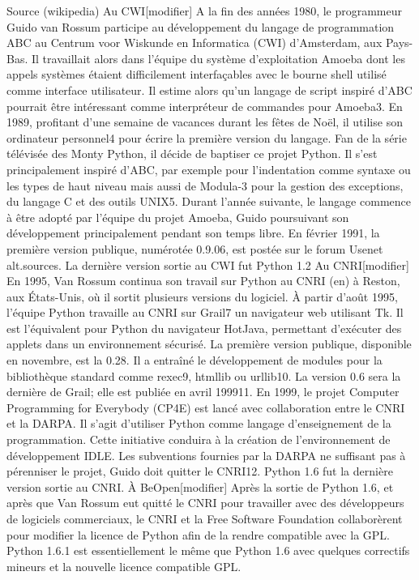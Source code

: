 Source (wikipedia)
Au CWI[modifier]
A la fin des années 1980, le programmeur Guido van Rossum participe au développement du langage de programmation ABC au Centrum voor Wiskunde en Informatica (CWI) d'Amsterdam, aux Pays-Bas. Il travaillait alors dans l’équipe du système d’exploitation Amoeba dont les appels systèmes étaient difficilement interfaçables avec le bourne shell utilisé comme interface utilisateur. Il estime alors qu’un langage de script inspiré d’ABC pourrait être intéressant comme interpréteur de commandes pour Amoeba3.
En 1989, profitant d’une semaine de vacances durant les fêtes de Noël, il utilise son ordinateur personnel4 pour écrire la première version du langage. Fan de la série télévisée des Monty Python, il décide de baptiser ce projet Python. Il s’est principalement inspiré d’ABC, par exemple pour l’indentation comme syntaxe ou les types de haut niveau mais aussi de Modula-3 pour la gestion des exceptions, du langage C et des outils UNIX5.
Durant l’année suivante, le langage commence à être adopté par l’équipe du projet Amoeba, Guido poursuivant son développement principalement pendant son temps libre. En février 1991, la première version publique, numérotée 0.9.06, est postée sur le forum Usenet alt.sources. La dernière version sortie au CWI fut Python 1.2
Au CNRI[modifier]
En 1995, Van Rossum continua son travail sur Python au CNRI (en) à Reston, aux États-Unis, où il sortit plusieurs versions du logiciel.
À partir d'août 1995, l'équipe Python travaille au CNRI sur Grail7 un navigateur web utilisant Tk. Il est l'équivalent pour Python du navigateur HotJava, permettant d'exécuter des applets dans un environnement sécurisé. La première version publique, disponible en novembre, est la 0.28. Il a entraîné le développement de modules pour la bibliothèque standard comme rexec9, htmllib ou urllib10. La version 0.6 sera la dernière de Grail; elle est publiée en avril 199911.
En 1999, le projet Computer Programming for Everybody (CP4E) est lancé avec collaboration entre le CNRI et la DARPA. Il s'agit d'utiliser Python comme langage d'enseignement de la programmation. Cette initiative conduira à la création de l'environnement de développement IDLE. Les subventions fournies par la DARPA ne suffisant pas à pérenniser le projet, Guido doit quitter le CNRI12. Python 1.6 fut la dernière version sortie au CNRI.
À BeOpen[modifier]
Après la sortie de Python 1.6, et après que Van Rossum eut quitté le CNRI pour travailler avec des développeurs de logiciels commerciaux, le CNRI et la Free Software Foundation collaborèrent pour modifier la licence de Python afin de la rendre compatible avec la GPL. Python 1.6.1 est essentiellement le même que Python 1.6 avec quelques correctifs mineurs et la nouvelle licence compatible GPL.
